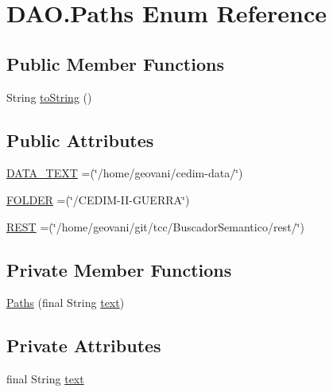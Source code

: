 \hypertarget{enumDAO_1_1Paths}{}\section{D\+A\+O.\+Paths Enum Reference}
\label{enumDAO_1_1Paths}
\subsection*{Public Member Functions}
\begin{DoxyCompactItemize}
\item 
String \hyperlink{enumDAO_1_1Paths_aec97ee6149db33c8d1880cf43ff3a77b}{to\+String} ()
\end{DoxyCompactItemize}
\subsection*{Public Attributes}
\begin{DoxyCompactItemize}
\item 
\hyperlink{enumDAO_1_1Paths_ab64a399f7d835455b9cf0b1207192eb0}{D\+A\+T\+A\+\_\+\+T\+E\+XT} =(\char`\"{}/home/geovani/cedim-\/data/\char`\"{})
\item 
\hyperlink{enumDAO_1_1Paths_a59211c627b8e37937625d10bcfab4899}{F\+O\+L\+D\+ER} =(\char`\"{}/C\+E\+D\+IM-\/II-\/G\+U\+E\+R\+RA\char`\"{})
\item 
\hyperlink{enumDAO_1_1Paths_a43cc47a733e9d706d1b299cb16a13f7a}{R\+E\+ST} =(\char`\"{}/home/geovani/git/tcc/Buscador\+Semantico/rest/\char`\"{})
\end{DoxyCompactItemize}
\subsection*{Private Member Functions}
\begin{DoxyCompactItemize}
\item 
\hyperlink{enumDAO_1_1Paths_a7986fd29f6dec9c0c8d6d28574b81b1c}{Paths} (final String \hyperlink{enumDAO_1_1Paths_aea7fb1a9db7ac0c55f6f7c9c81852d98}{text})
\end{DoxyCompactItemize}
\subsection*{Private Attributes}
\begin{DoxyCompactItemize}
\item 
final String \hyperlink{enumDAO_1_1Paths_aea7fb1a9db7ac0c55f6f7c9c81852d98}{text}
\end{DoxyCompactItemize}


